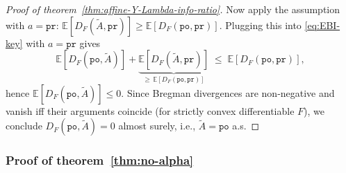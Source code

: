 \documentclass{article}
\theoremstyle{plain}
\theoremstyle{definition}
\newcommand{\pr}{\texttt{pr}}
\newcommand{\po}{\texttt{po}}
\newcommand{\E}{\mathbb E}
\begin{document}
\begin{proof}[Proof of theorem~\ref{thm:affine-Y-Lambda-info-ratio}]
    Now apply the assumption with $a=\pr$:
    \(
    \E[D_F(\tilde{A}, \pr)] \ge \E[D_F(\po,\pr)].
    \)
    Plugging this into \eqref{eq:EBI-key} with $a=\pr$ gives
    \[
        \E\!\left[D_F(\po,\tilde{A})\right] + \underbrace{\E\!\left[D_F(\tilde{A}, \pr)\right]}_{\ge \,\E[D_F(\po,\pr)]}
        \;\le\;
        \E\!\left[D_F(\po,\pr)\right],
    \]
    hence $\E[D_F(\po,\tilde{A})] \le 0$. Since Bregman divergences are non‑negative and vanish iff their arguments coincide (for strictly convex differentiable $F$), we conclude $D_F(\po,\tilde{A})=0$ almost surely, i.e., $\tilde{A}=\po$ a.s.
\end{proof}

\subsubsection{Proof of theorem~\ref{thm:no-alpha}}
\label{proof:thm:no-alpha}
\end{document}
